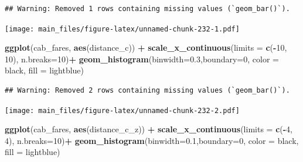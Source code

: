 \documentclass[
]{book}
\newenvironment{Shaded}{\begin{snugshade}}{\end{snugshade}}
\newcommand{\AttributeTok}[1]{\textcolor[rgb]{0.13,0.29,0.53}{#1}}
\newcommand{\DecValTok}[1]{\textcolor[rgb]{0.00,0.00,0.81}{#1}}
\newcommand{\FloatTok}[1]{\textcolor[rgb]{0.00,0.00,0.81}{#1}}
\newcommand{\FunctionTok}[1]{\textcolor[rgb]{0.13,0.29,0.53}{\textbf{#1}}}
\newcommand{\NormalTok}[1]{#1}
\newcommand{\SpecialCharTok}[1]{\textcolor[rgb]{0.81,0.36,0.00}{\textbf{#1}}}
\newcommand{\StringTok}[1]{\textcolor[rgb]{0.31,0.60,0.02}{#1}}
\begin{document}
\begin{verbatim}
## Warning: Removed 1 rows containing missing values (`geom_bar()`).
\end{verbatim}

\texttt{[image: main\_files/figure-latex/unnamed-chunk-232-1.pdf]}

\begin{Shaded}
\begin{Highlighting}[]
\FunctionTok{ggplot}\NormalTok{(cab\_fares, }\FunctionTok{aes}\NormalTok{(distance\_c)) }\SpecialCharTok{+}
        \FunctionTok{scale\_x\_continuous}\NormalTok{(}\AttributeTok{limits =} \FunctionTok{c}\NormalTok{(}\SpecialCharTok{{-}}\DecValTok{10}\NormalTok{, }\DecValTok{10}\NormalTok{), }\AttributeTok{n.breaks=}\DecValTok{10}\NormalTok{)}\SpecialCharTok{+}
        \FunctionTok{geom\_histogram}\NormalTok{(}\AttributeTok{binwidth=}\FloatTok{0.3}\NormalTok{,}\AttributeTok{boundary=}\DecValTok{0}\NormalTok{,}
                       \AttributeTok{color =} \StringTok{\textquotesingle{}black\textquotesingle{}}\NormalTok{,}
                       \AttributeTok{fill =} \StringTok{\textquotesingle{}lightblue\textquotesingle{}}\NormalTok{)}
\end{Highlighting}
\end{Shaded}

\begin{verbatim}
## Warning: Removed 2 rows containing missing values (`geom_bar()`).
\end{verbatim}

\texttt{[image: main\_files/figure-latex/unnamed-chunk-232-2.pdf]}

\begin{Shaded}
\begin{Highlighting}[]
\FunctionTok{ggplot}\NormalTok{(cab\_fares, }\FunctionTok{aes}\NormalTok{(distance\_c\_z)) }\SpecialCharTok{+}
        \FunctionTok{scale\_x\_continuous}\NormalTok{(}\AttributeTok{limits =} \FunctionTok{c}\NormalTok{(}\SpecialCharTok{{-}}\DecValTok{4}\NormalTok{, }\DecValTok{4}\NormalTok{), }\AttributeTok{n.breaks=}\DecValTok{10}\NormalTok{)}\SpecialCharTok{+}
        \FunctionTok{geom\_histogram}\NormalTok{(}\AttributeTok{binwidth=}\FloatTok{0.1}\NormalTok{,}\AttributeTok{boundary=}\DecValTok{0}\NormalTok{,}
                       \AttributeTok{color =} \StringTok{\textquotesingle{}black\textquotesingle{}}\NormalTok{,}
                       \AttributeTok{fill =} \StringTok{\textquotesingle{}lightblue\textquotesingle{}}\NormalTok{)}
\end{Highlighting}
\end{Shaded}
\end{document}
